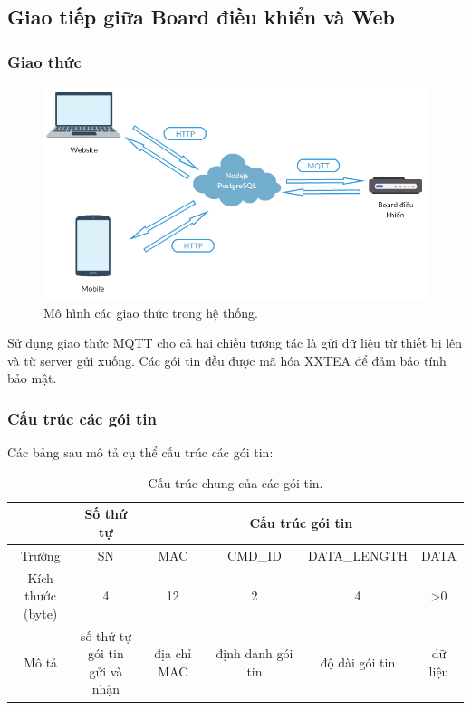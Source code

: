 \documentclass[a4paper,12pt,oneside]{article}
\begin{document}
\subsection{Giao tiếp giữa Board điều khiển và Web}
\subsubsection{Giao thức}

\begin{figure}[H]
	\centering
	\includegraphics[scale=.5]{hinh/system-protocol.png}
	\caption{Mô hình các giao thức trong hệ thống.}
\end{figure}

\noindent Sử dụng giao thức MQTT cho cả hai chiều tương tác là gửi dữ liệu từ thiết bị lên và từ server gửi xuống. Các gói tin đều được mã hóa XXTEA để đảm bảo tính bảo mật.
\subsubsection{Cấu trúc các gói tin}
\noindent Các bảng sau mô tả cụ thể cấu trúc các gói tin:
\begin{table}[H]
\begin{tabular}{|c|c|c|c|c|c|}
\hline 
 & Số thứ tự & \multicolumn{4}{|c|}{Cấu trúc gói tin} \\ 
\hline 
Trường & SN & MAC & CMD\_ID & DATA\_LENGTH  & DATA \\ 
\hline 
\makecell{Kích thước\\ (byte)} & 4 & 12 & 2 & 4 & >0 \\ 
\hline 
Mô tả & \makecell{số thứ tự \\ gói tin\\ gửi và nhận} & địa chỉ MAC & định danh gói tin & độ dài gói tin & dữ liệu \\ 
\hline 
\end{tabular} 
\caption{Cấu trúc chung của các gói tin.}
\end{table}
\end{document}
